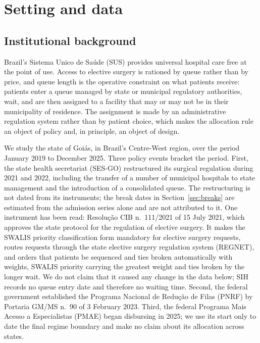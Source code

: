 %

\section{Setting and data}
\label{sec:data}

\subsection{Institutional background}

Brazil's Sistema Unico de Sa\'ude (SUS) provides universal hospital care free at
the point of use. Access to elective surgery is rationed by queue rather than by
price, and queue length is the operative constraint on what patients receive:
patients enter a queue managed by state or municipal
regulatory authorities, wait, and are then assigned to a facility that may or
may not be in their municipality of residence. The assignment is made by an
administrative regulation system rather than by patient choice, which makes the
allocation rule an object of policy and, in principle, an object of design.

We study the state of Goi\'as, in Brazil's Centre-West region, over the period
January 2019 to December 2025. Three policy events bracket the period. First,
the state health secretariat (SES-GO) restructured its surgical regulation
during 2021 and 2022, including the transfer of a number of municipal hospitals
to state management and the introduction of a consolidated queue.
The restructuring is not dated from its instruments; the break dates in Section~\ref{sec:breaks} are estimated from the admission series alone and are not attributed to it. One instrument has been read: Resolu\c{c}\~ao CIB
n.\ 111/2021 of 15 July 2021, which approves the state protocol for the regulation of elective surgery. It makes the
SWALIS priority classification form mandatory for elective surgery requests, routes requests through the state elective
surgery regulation system (REGNET), and orders that patients be sequenced and ties broken automatically with weights, SWALIS
priority carrying the greatest weight and ties broken by the longer wait. We do not claim that it caused any change in the data
below; SIH records no queue entry date and therefore no waiting time. Second, the federal government established the Programa
Nacional de Redu\c{c}\~ao de Filas (PNRF) by Portaria GM/MS n.\ 90 of 3 February
2023. Third, the federal Programa Mais Acesso a Especialistas (PMAE) began
disbursing in 2025; we use its start only to date the final regime boundary and
make no claim about its allocation across states.


